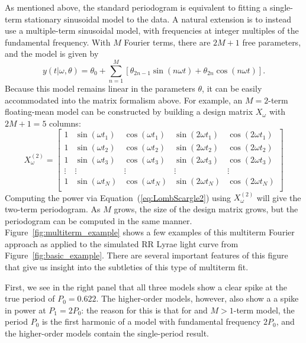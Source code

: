 \documentclass[12pt,preprint]{aastex}
\newcommand{\Fig}[1]{Figure~\ref{fig:#1}}
\newcommand{\fig}[1]{\Fig{#1}}
\newcommand{\Eq}[1]{Equation~(\ref{eq:#1})}
\newcommand{\eq}[1]{\Eq{#1}}
\begin{document}
As mentioned above, the standard periodogram is equivalent to fitting a single-term stationary sinusoidal model to the data. A natural extension is to instead use a multiple-term sinusoidal model, with frequencies at integer multiples of the fundamental frequency. With $M$ Fourier terms, there are $2M + 1$ free parameters, and the model is given by
\begin{equation}
  y(t|\omega,\theta) = \theta_0 + \sum_{n=1}^M \left[\theta_{2n - 1}\sin(n\omega t) + \theta_{2n}\cos(n\omega t)\right].
\end{equation}
Because this model remains linear in the parameters $\theta$, it can be easily accommodated into the matrix formalism above. For example, an $M = 2$-term floating-mean model can be constructed by building a design matrix $X_\omega$ with $2M + 1 = 5$ columns:
\begin{equation}
X_\omega^{(2)} = \left[
\begin{array}{ccccc}
1 & \sin(\omega t_1) & \cos(\omega t_1) & \sin(2\omega t_1) & \cos(2\omega t_1)\\
1 & \sin(\omega t_2) & \cos(\omega t_2) & \sin(2\omega t_2) & \cos(2\omega t_2)\\
1 & \sin(\omega t_3) & \cos(\omega t_3) & \sin(2\omega t_3) & \cos(2\omega t_3)\\
\vdots & \vdots & \vdots & \vdots & \vdots \\
1 & \sin(\omega t_N) & \cos(\omega t_N) & \sin(2\omega t_N) & \cos(2\omega t_N)\\
\end{array}
\right]
\end{equation}
Computing the power via \eq{LombScargle2} using $X_\omega^{(2)}$ will give the two-term periodogram. As $M$ grows, the size of the design matrix grows, but the periodogram can be computed in the same manner. \fig{multiterm_example} shows a few examples of this multiterm Fourier approach as applied to the simulated RR Lyrae light curve from \fig{basic_example}. There are several important features of this figure that give us insight into the subtleties of this type of multiterm fit.

First, we see in the right panel that all three models show a clear spike at the true period of $P_0 = 0.622$. The higher-order models, however, also show a a spike in power at $P_1 = 2 P_0$: the reason for this is that for and $M>1$-term model, the period $P_0$ is the first harmonic of a model with fundamental frequency $2P_0$, and the higher-order models contain the single-period result.
\end{document}
